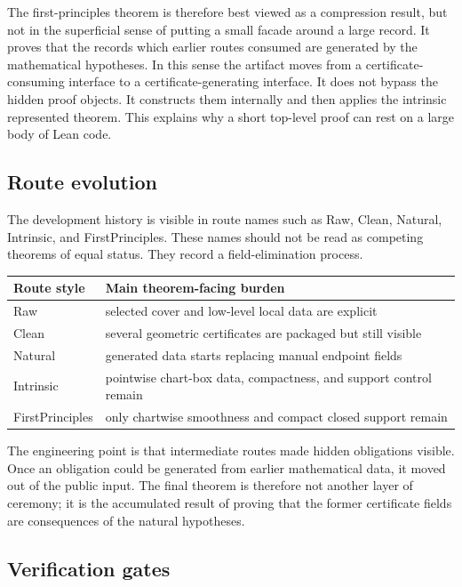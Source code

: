 The first-principles theorem is therefore best viewed as a compression result,
but not in the superficial sense of putting a small facade around a large
record.  It proves that the records which earlier routes consumed are
generated by the mathematical hypotheses.  In this sense the artifact moves
from a certificate-consuming interface to a certificate-generating interface.
It does not bypass the hidden proof objects.  It constructs them internally and
then applies the intrinsic represented theorem.  This explains why a short
top-level proof can rest on a large body of Lean code.

\subsection{Route evolution}

The development history is visible in route names such as Raw, Clean, Natural,
Intrinsic, and FirstPrinciples.  These names should not be read as competing
theorems of equal status.  They record a field-elimination process.

\begin{center}
\begin{tabular}{ll}
\hline
Route style & Main theorem-facing burden \\
\hline
Raw & selected cover and low-level local data are explicit \\
Clean & several geometric certificates are packaged but still visible \\
Natural & generated data starts replacing manual endpoint fields \\
Intrinsic & pointwise chart-box data, compactness, and support control remain \\
FirstPrinciples & only chartwise smoothness and compact closed support remain \\
\hline
\end{tabular}
\end{center}

The engineering point is that intermediate routes made hidden obligations
visible.  Once an obligation could be generated from earlier mathematical
data, it moved out of the public input.  The final theorem is therefore not
another layer of ceremony; it is the accumulated result of proving that the
former certificate fields are consequences of the natural hypotheses.

\subsection{Verification gates}

